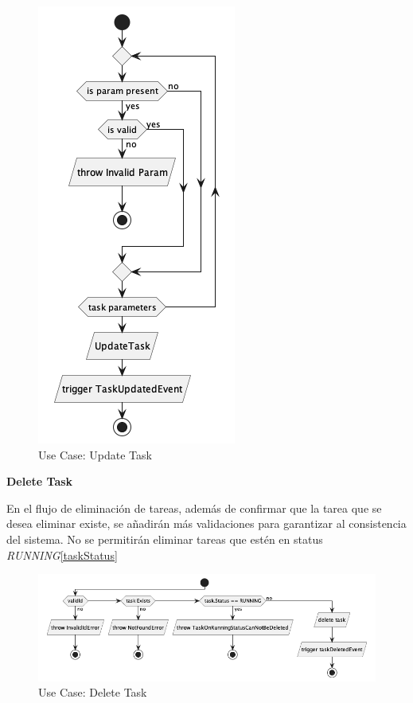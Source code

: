 \begin{figure}[H]
    \centering
    \includegraphics[height=0.4\textheight]{./part/Proyecto_ejecutivo/memoria_descriptiva/descripcionDelProyecto/manager/uml/updateTaskUseCase}
    \caption{Use Case: Update Task}\label{fig:Use Case-Update Task}
\end{figure}

\textbf{Delete Task}

En el flujo de eliminación de tareas, además de confirmar que la tarea que se desea eliminar existe, se añadirán más validaciones para garantizar al consistencia del sistema. No se permitirán eliminar tareas que estén en status \textit{RUNNING}\ref{taskStatus}

\begin{figure}[H]
    \centering
    \includegraphics[height=0.2\textheight]{./part/Proyecto_ejecutivo/memoria_descriptiva/descripcionDelProyecto/manager/uml/deleteTaskUseCase}
    \caption{Use Case: Delete Task}\label{fig:Use Case-Delete Task}
\end{figure}

